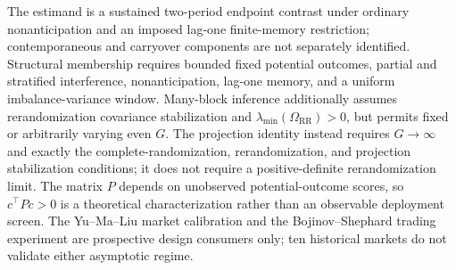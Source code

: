 The estimand is a sustained two-period endpoint contrast under ordinary nonanticipation and an imposed lag-one finite-memory restriction; contemporaneous and carryover components are not separately identified.  Structural membership requires bounded fixed potential outcomes, partial and stratified interference, nonanticipation, lag-one memory, and a uniform imbalance-variance window.  Many-block inference additionally assumes rerandomization covariance stabilization and \(\lambda_{\min}(\Omega_{\mathrm{RR}})>0\), but permits fixed or arbitrarily varying even \(G\).  The projection identity instead requires \(G\to\infty\) and exactly the complete-randomization, rerandomization, and projection stabilization conditions; it does not require a positive-definite rerandomization limit.  The matrix \(P\) depends on unobserved potential-outcome scores, so \(c^\top Pc>0\) is a theoretical characterization rather than an observable deployment screen.  The Yu--Ma--Liu market calibration and the Bojinov--Shephard trading experiment are prospective design consumers only; ten historical markets do not validate either asymptotic regime.